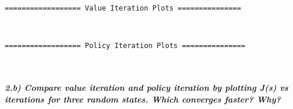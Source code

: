\documentclass[11pt]{article}
\begin{document}
    \begin{Verbatim}[commandchars=\\\{\}]
================== Value Iteration Plots ===============

    \end{Verbatim}

    \begin{center}
    \end{center}
    { \hspace*{\fill} \\}
    
    \begin{Verbatim}[commandchars=\\\{\}]
================== Policy Iteration Plots ===============

    \end{Verbatim}

    \begin{center}
    \end{center}
    { \hspace*{\fill} \\}
    
    \subparagraph{2.b) Compare value iteration and policy iteration by
plotting J(s) vs iterations for three random states. Which converges
faster?
Why?}\label{b-compare-value-iteration-and-policy-iteration-by-plotting-js-vs-iterations-for-three-random-states.-which-converges-faster-why}
\end{document}
